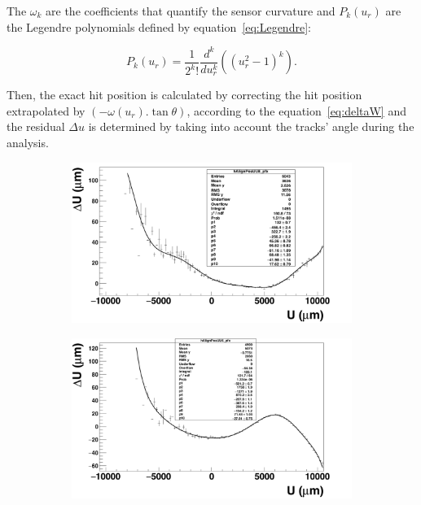       The $\omega_{k}$ are the coefficients that quantify the sensor curvature and $P_{k}(u_{r})$ are the Legendre polynomials defined by equation~\ref{eq:Legendre}:

      \begin{equation}
        P_{k}\left(u_{r}\right) = \frac{1}{2^{k}!}\frac{d^{k}}{du_{r}^{k}} \left( (u_{r}^2 - 1)^{k}\right).
        \label{eq:Legendre}
      \end{equation}

      Then, the exact hit position is calculated by correcting the hit position extrapolated by $\left(-\omega(u_{r}).\tan{\theta}\right)$, according to the equation~\ref{eq:deltaW} and the residual $\Delta u$ is determined by taking into account the tracks' angle during the analysis.      

      \begin{figure}[h]
        \centering
        \begin{subfigure}[t]{0.45\textwidth}
          \centering
          \includegraphics[width = 1.2\textwidth]{Pictures/deformation/profileFitted_pl8.png}
          \caption{}
          \label{fig:profileFitted_front}
        \end{subfigure}
        \hfill
        \begin{subfigure}[t]{0.45\textwidth}
          \centering
          \includegraphics[width = 1.2\textwidth]{Pictures/deformation/profileFitted_pl6.png}

\end{subfigure}
\end{figure}
